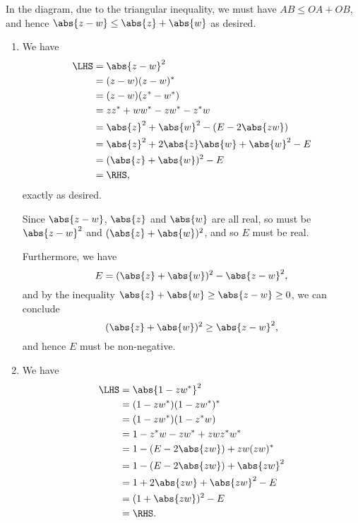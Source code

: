 \Question{\currfilebase}

\begin{center}
    
\end{center}

In the diagram, due to the triangular inequality, we must have \(AB \leq OA + OB\), and hence \(\abs{z - w} \leq \abs{z} + \abs{w}\) as desired.

\begin{enumerate}
    \item We have
          \begin{align*}
              \LHS & = \abs{z - w}^2                                 \\
                   & = (z - w)(z - w)^*                              \\
                   & = (z - w)(z^* - w^*)                            \\
                   & = z z^* + w w^* - z w^* - z^* w                 \\
                   & = \abs{z}^2 + \abs{w}^2 - (E - 2\abs{zw})       \\
                   & = \abs{z}^2 + 2 \abs{z} \abs{w} + \abs{w}^2 - E \\
                   & = (\abs{z} + \abs{w})^2 - E                     \\
                   & = \RHS,
          \end{align*}
          exactly as desired.

          Since \(\abs{z - w}\), \(\abs{z}\) and \(\abs{w}\) are all real, so must be \(\abs{z - w}^2\) and \((\abs{z} + \abs{w})^2\), and so \(E\) must be real.

          Furthermore, we have
          \[
              E = (\abs{z} + \abs{w})^2 - \abs{z - w}^2,
          \]
          and by the inequality \(\abs{z} + \abs{w} \geq \abs{z - w} \geq 0\), we can conclude
          \[
              (\abs{z} + \abs{w})^2 \geq \abs{z - w}^2,
          \]
          and hence \(E\) must be non-negative.

    \item We have
          \begin{align*}
              \LHS & = \abs{1 - z w^*}^2                 \\
                   & = (1 - z w^*)(1 - z w^*)^*          \\
                   & = (1 - z w^*)(1 - z^* w)            \\
                   & = 1 - z^* w - z w^* + z w z^* w^*   \\
                   & = 1 - (E - 2 \abs{zw}) + zw (zw)^*  \\
                   & = 1 - (E - 2 \abs{zw}) + \abs{zw}^2 \\
                   & = 1 + 2 \abs{zw} + \abs{zw}^2 - E   \\
                   & = (1 + \abs{zw})^2 - E              \\
                   & = \RHS.
          \end{align*}
\end{enumerate}

